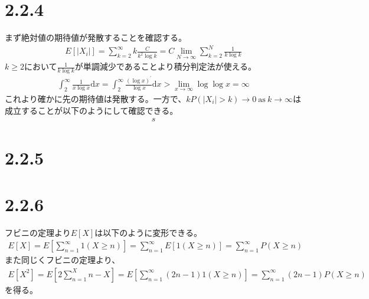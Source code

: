 \documentclass{article}
\begin{document}
\section{2.2.4}
まず絶対値の期待値が発散することを確認する。
\begin{align*}
	E\left[ |X_i| \right] = \sum_{k = 2}^{\infty} k \frac{C}{k^2 \log k} = C \lim_{N \to \infty} \sum_{k = 2}^{N} \frac{1}{k \log k}
\end{align*}
$k \geq 2$において$\frac{1}{k \log k}$が単調減少であることより積分判定法が使える。
\begin{align*}
	\int_2^{\infty} \frac{1}{x\log x} \mathrm{d}x = \int_2^{\infty} \frac{\left( \log x \right)^{\prime}}{\log x} \mathrm{d}x > \lim_{x\to \infty} \log \log x = \infty
\end{align*}
これより確かに先の期待値は発散する。一方で、$k P\left( |X_i| > k \right) \to 0\ \text{as}\ k \to \infty$は成立することが以下のようにして確認できる。
\begin{align*}
	s
\end{align*}


\section{2.2.5}



\section{2.2.6}
フビニの定理より$E[X]$は以下のように変形できる。
\begin{align*}
	E\left[ X \right] = E\left[ \sum_{n = 1}^{\infty} 1(X \geq n) \right] = \sum_{n = 1}^{\infty} E[1(X \geq n)] = \sum_{n = 1}^{\infty} P(X \geq n)
\end{align*}
また同じくフビニの定理より、
\begin{align*}
	E[X^2] = E\left[ 2 \sum_{n=1}^X n - X \right] = E\left[ \sum_{n=1}^{\infty} (2n-1) 1(X \geq n) \right] = \sum_{n=1}^{\infty} (2n-1) P(X \geq n)
\end{align*}
を得る。
\end{document}
